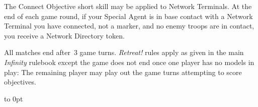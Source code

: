 \medskip%
  The Connect Objective short skill
may be applied to Network Terminals.  At the end of each game round,
if your Special Agent is in base contact with a Network Terminal you
have connected, not a marker, and no enemy troops are in contact, you
receive a Network Directory token.

  All matches end after~3 game turns.
\emph{Retreat!} rules apply as given in the main \emph{Infinity}
rulebook except the game does not end once one player has no models in
play: The remaining player may play out the game turns attempting to
score objectives.

\vfill
\vbox to 0pt{}
